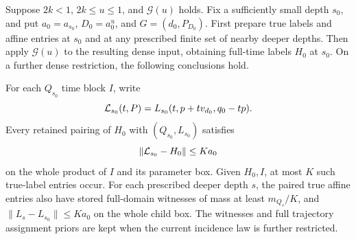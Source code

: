 \begin{lemma}
\label{a07:full-time-comparison}
Suppose \(2k<1\), \(2k\le u\le1\), and
\(\mathcal G(u)\) holds. Fix a sufficiently small depth \(s_0\), and put
\(a_0=a_{s_0}\), \(D_0=a_0^u\), and \(G=(d_0,P_{D_0})\).
First prepare true labels and affine entries at \(s_0\) and at
any prescribed finite set of nearby deeper depths. Then apply
\(\mathcal G(u)\) to the resulting dense input, obtaining
full-time labels \(H_0\) at \(s_0\). On a further dense
restriction, the following conclusions hold.

For each \(Q_{s_0}\) time block \(I\), write
\[
 {\cal L}_{s_0}(t,P)
   =L_{s_0}(t,p+t v_{d_0},q_0-tp).
\]
Every retained pairing of \(H_0\) with \((Q_{s_0},L_{s_0})\)
satisfies
\[
 \|{\cal L}_{s_0}-H_0\|\le Ka_0
\]
on the whole product of \(I\) and its parameter box. Given
\(H_0,I\), at most \(K\) such true-label entries occur.
For each prescribed deeper depth \(s\), the paired true affine
entries also have stored full-domain witnesses of mass at least
\(m_{Q_s}/K\), and
\(\|L_s-L_{s_0}\|\le Ka_0\) on the whole child box.
The witnesses and full trajectory assignment priors are kept when
the current incidence law is further restricted.
\end{lemma}

